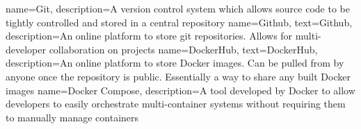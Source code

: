 {
    name={Git},
    description={A version control system which allows source code to be tightly controlled and stored in a central repository}
}
{
    name={Github},
    text={Github},
    description={An online platform to store git repositories. Allows for multi-developer collaboration on projects}
}
{
    name={DockerHub},
    text={DockerHub},
    description={An online platform to store Docker images. Can be pulled from by anyone once the repository is public. Essentially a way to share any built Docker images}
}
{
    name={Docker Compose},
    description={A tool developed by Docker to allow developers to easily orchestrate multi-container systems without requiring them to manually manage containers}
}
